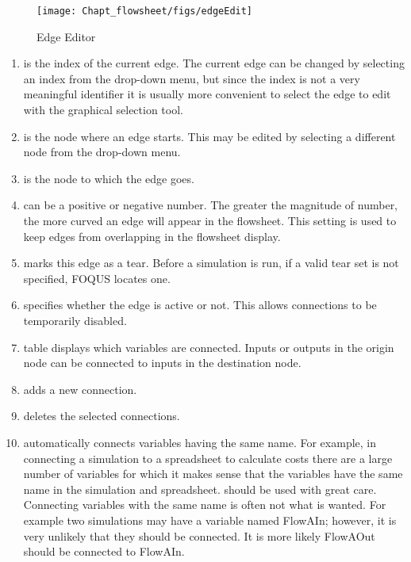 \begin{figure}[H]
	\begin{center}
		\texttt{[image: Chapt\_flowsheet/figs/edgeEdit]}
		\caption{Edge Editor}
		\label{fig.edge.editor}
	\end{center}
\end{figure}
\begin{enumerate}
	\item {} is the index of the current edge. The current edge can be changed by selecting an index from the drop-down menu, but since the index is not a very meaningful identifier it is usually more convenient to select the edge to edit with the graphical selection tool.
	\item {} is the node where an edge starts. This may be edited by selecting a different node from the drop-down menu.
	\item {} is the node to which the edge goes.
	\item {} can be a positive or negative number. The greater the magnitude of number, the more curved an edge will appear in the flowsheet. This setting is used to keep edges from overlapping in the flowsheet display.
	\item {} marks this edge as a tear.  Before a simulation is run, if a valid tear set is not specified, FOQUS locates one.
	\item {} specifies whether the edge is active or not. This allows connections to be temporarily disabled.
	\item {} table displays which variables are connected.  Inputs or outputs in the origin node can be connected to inputs in the destination node.
	\item {} adds a new connection.
	\item {} deletes the selected connections.
	\item {} automatically connects variables having the same name. For example, in connecting a simulation to a spreadsheet to calculate costs there are a large number of variables for which it makes sense that the variables have the same name in the simulation and spreadsheet.  should be used with great care. Connecting variables with the same name is often not what is wanted. For example two simulations may have a variable named FlowAIn; however, it is very unlikely that they should be connected. It is more likely FlowAOut should be connected to FlowAIn.
\end{enumerate}

